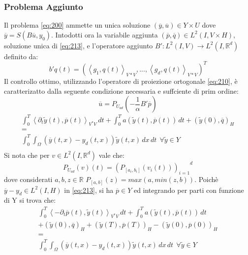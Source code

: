 \subsubsection{Problema Aggiunto}
Il problema \ref{eq:200} ammette un unica soluzione $(\overline{y},\overline{u}){\in}Y{\times}U$ dove $\overline{y}=S(B\overline{u},y_0)$.
Intodotti ora la variabile aggiunta $(\overline{p},\overline{q}) \in L^2(I,V{\times}H)$, soluzione unica di \ref{eq:213}, e l'operatore aggiunto $B':L^2(I,V){\rightarrow}L^2(I,\mathbb{R}^d)$ definito da:
\begin{equation}
b'q(t) = ( \left \langle g_1,q(t) \right \rangle_{V*V}, . . . ,\left \langle g_d,q(t) \right \rangle_{V*V})^T
\label{eq:211}
\end{equation}
Il controllo ottimo, utilizzando l'operatore di proiezione ortogonale \ref{eq:210}, è caratterizatto dalla seguente condizione necessaria e suffciente di prim ordine:
\begin{equation}
\overline{u}=P_{U_{ad}}\left( -\frac{1}{\alpha}B'\overline{p} \right)
\label{eq:212}
\end{equation}
\begin{equation}
\begin{array}{c}
	\int_{0}^{T} \left \langle {\partial_{t}}\tilde{y}(t),\overline{p}(t) \right \rangle_{V^*V} \, dt +  	\int_{0}^{T} a(\tilde{y}(t),\overline{p}(t)) \, dt + (\tilde{y}(0),\overline{q})_H  \\
	 = \\
	\int_{0}^{T} \int_{\Omega} (\overline{y}(t,x)-y_d(t,x))\tilde{y}(t,x) \,dx \, dt  \ \ \forall \tilde{y} \in Y \\
\end{array}
\label{eq:213}
\end{equation}
Si nota che per $v \in L^2(I,\mathbb{R}^d)$ vale che:
\begin{equation}
P_{U_{ad}}(v)(t) = {(P_{[a_i,b_i]}(v_i(t)))_{i=1}}^d
\label{eq:214}
\end{equation}
dove considerati $a,b,z \in \mathbb{R}$ $P_{[a,b]}(z) = max(a,min(z,b))$.
Poichè $\overline{y} - y_d \in L^2(I,H)$ in \ref{eq:213}, si ha $\overline{p} \in Y$ ed integrando per parti con funzione di Y si trova che:
{\renewcommand\arraystretch{2}
\begin{equation}
\begin{array}{c}
	\int_{0}^{T} \left \langle -{\partial_{t}}\overline{p}(t),\tilde{y}(t) \right \rangle_{V^*V} \, dt +  	\int_{0}^{T} a(\tilde{y}(t),\overline{p}(t)) \, dt \\
	+ (\tilde{y}(0),\overline{q})_H + (\tilde{y}(T),\overline{p}(T))_H - (\tilde{y}(0),\overline{p}(0))_H \\
	 = \\
	\int_{0}^{T} \int_{\Omega} (\overline{y}(t,x)-y_d(t,x))\tilde{y}(t,x) \,dx \, dt  \ \ \forall \tilde{y} \in Y \\
\end{array}
\label{eq:215}
\end{equation}
} %
